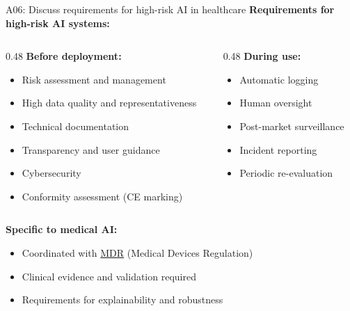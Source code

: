 \documentclass[aspectratio=169, 10pt]{beamer}
\begin{document}
\begin{frame}{A06: Discuss requirements for high-risk AI in healthcare}
    \textbf{Requirements for high-risk AI systems:}
    
    \vspace{0.3cm}
    \begin{columns}[T]
        \begin{column}{0.48\textwidth}
            \textbf{Before deployment:}
            \begin{itemize}
                \item Risk assessment and management
                \item High data quality and representativeness
                \item Technical documentation
                \item Transparency and user guidance
                \item Cybersecurity
                \item Conformity assessment (CE marking)
            \end{itemize}
        \end{column}
        \begin{column}{0.48\textwidth}
            \textbf{During use:}
            \begin{itemize}
                \item Automatic logging
                \item Human oversight
                \item Post-market surveillance
                \item Incident reporting
                \item Periodic re-evaluation
            \end{itemize}
        \end{column}
    \end{columns}
    
    \vspace{0.3cm}
    \textbf{Specific to medical AI:}
    \begin{itemize}
        \item Coordinated with \href{https://eur-lex.europa.eu/legal-content/EN/TXT/?uri=CELEX:32017R0745}{MDR} (Medical Devices Regulation)
        \item Clinical evidence and validation required
        \item Requirements for explainability and robustness
    \end{itemize}
\end{frame}
\end{document}
